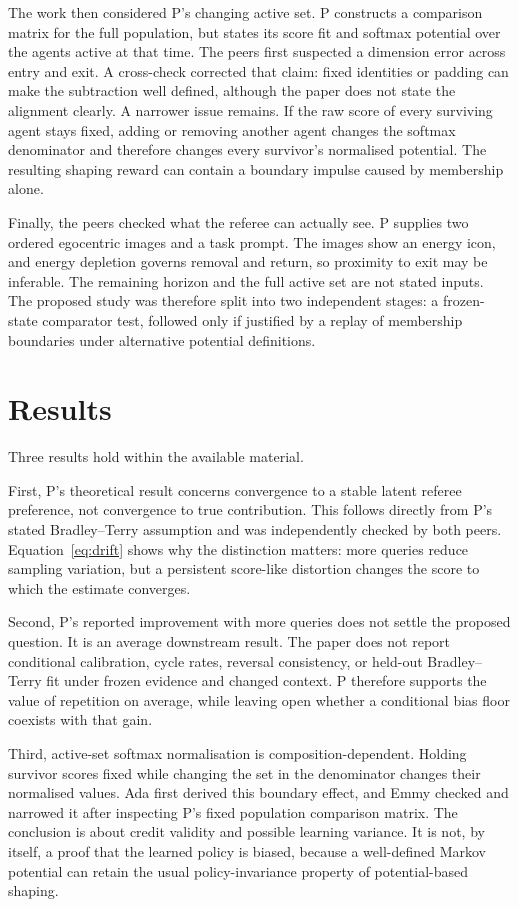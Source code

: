 \documentclass{article}
\begin{document}
The work then considered P's changing active set.  P constructs a comparison matrix for the full population, but states its score fit and softmax potential over the agents active at that time.  The peers first suspected a dimension error across entry and exit.  A cross-check corrected that claim: fixed identities or padding can make the subtraction well defined, although the paper does not state the alignment clearly.  A narrower issue remains.  If the raw score of every surviving agent stays fixed, adding or removing another agent changes the softmax denominator and therefore changes every survivor's normalised potential.  The resulting shaping reward can contain a boundary impulse caused by membership alone.

Finally, the peers checked what the referee can actually see.  P supplies two ordered egocentric images and a task prompt.  The images show an energy icon, and energy depletion governs removal and return, so proximity to exit may be inferable.  The remaining horizon and the full active set are not stated inputs.  The proposed study was therefore split into two independent stages: a frozen-state comparator test, followed only if justified by a replay of membership boundaries under alternative potential definitions.

\section{Results}

Three results hold within the available material.

First, P's theoretical result concerns convergence to a stable latent referee preference, not convergence to true contribution.  This follows directly from P's stated Bradley--Terry assumption and was independently checked by both peers.  Equation~\ref{eq:drift} shows why the distinction matters: more queries reduce sampling variation, but a persistent score-like distortion changes the score to which the estimate converges.

Second, P's reported improvement with more queries does not settle the proposed question.  It is an average downstream result.  The paper does not report conditional calibration, cycle rates, reversal consistency, or held-out Bradley--Terry fit under frozen evidence and changed context.  P therefore supports the value of repetition on average, while leaving open whether a conditional bias floor coexists with that gain.

Third, active-set softmax normalisation is composition-dependent.  Holding survivor scores fixed while changing the set in the denominator changes their normalised values.  Ada first derived this boundary effect, and Emmy checked and narrowed it after inspecting P's fixed population comparison matrix.  The conclusion is about credit validity and possible learning variance.  It is not, by itself, a proof that the learned policy is biased, because a well-defined Markov potential can retain the usual policy-invariance property of potential-based shaping.
\end{document}
